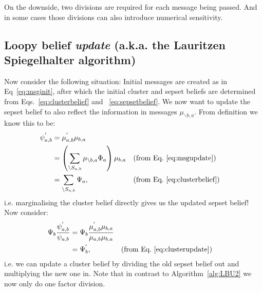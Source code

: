 \documentclass[oneside,english]{scrbook}
\begin{document}
On the downside, two divisions are required for each message being
passed. And in some cases those divisions can also introduce numerical
sensitivity.

\FloatBarrier
\subsection{Loopy belief \emph{update} (a.k.a. the Lauritzen Spiegelhalter algorithm)}

Now consider the following situation: Initial messages are created as
in Eq~\ref{eq:msginit}, after which the initial cluster and sepset
beliefs are determined from Eqs.~\ref{eq:clusterbelief} and
~\ref{eq:sepsetbelief}. We now want to update the sepset belief to also
reflect the information in messages $\mu_{\backslash b,a}$. From
definition we know this to be:
\begin{align}
  \psi^{'}_{a,b}
  &= \mu^{'}_{a,b}\mu_{b,a} \nonumber \\
  &= \left(\sum_{\backslash S_{a,b}} \mu_{\backslash b,a}\Phi_a\right)\mu_{b,a} && \text{(from Eq.~\ref{eq:msgupdate})} \nonumber\\
  &= \sum_{\backslash S_{a,b}} \Psi_a, && \text{(from Eq.~\ref{eq:clusterbelief})} \label{eq:sepsetupdate}
\end{align}
i.e. marginalising the cluster belief directly gives us the updated sepset belief! Now consider:
\begin{align}
  \Psi_b\frac{\psi^{'}_{a,b}}{\psi_{a,b}}
  &= \Psi_b \frac{\mu^{'}_{a,b}\mu_{b,a}}{\mu_{a,b}\mu_{b,a}} \nonumber \\
  &= \Psi^{'}_b, && \text{(from Eq.~\ref{eq:clusterupdate})}
\end{align}
i.e. we can update a cluster belief by dividing the old sepset belief
out and multiplying the new one in. Note that in contrast to
Algorithm~\ref{alg:LBU2} we now only do one factor division.
\end{document}
